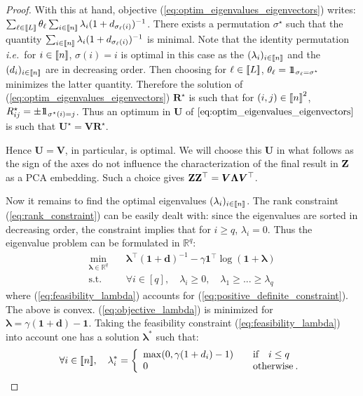 \begin{proof}
With this at hand, objective (\ref{eq:optim_eigenvalues_eigenvectors}) writes: $\sum_{\ell \in {[\![L]\!]}} \theta_\ell \sum_{i \in {[\![n]\!]}} \lambda_i (1 + d_{\sigma_\ell(i)})^{-1}$. There exists a permutation $\sigma^\star$ such that the quantity $\sum_{i \in {[\![n]\!]}} \lambda_i (1 + d_{\sigma_\ell(i)})^{-1}$ is minimal. Note that the identity permutation \textit{i.e.}\ for $i \in {[\![n]\!]}$, $ \sigma(i) = i$ is optimal in this case as the $(\lambda_i)_{i \in {[\![n]\!]}}$ and the $(d_i)_{i \in {[\![n]\!]}}$ are in decreasing order. Then choosing for $\ell \in {[\![L]\!]}$, $\theta_\ell = 1\!\!1_{\sigma_\ell = \sigma^\star}$ minimizes the latter quantity. Therefore the solution of (\ref{eq:optim_eigenvalues_eigenvectors}) $\bm{R}^{\star}$ is such that for $(i,j) \in {[\![n]\!]}^2$, $R^\star_{ij} = \pm 1\!\!1_{\sigma^\star(i)=j}$. Thus an optimum in $\bm{U}$ of $\ref{eq:optim_eigenvalues_eigenvectors}$ is such that $\bm{U}^\star = \bm{V} \bm{R}^\star$. 

Hence $\bm{U} = \bm{V}$, in particular, is optimal. We will choose this $\bm{U}$ in what follows as the sign of the axes do not influence the characterization of the final result in $\mathbf{Z}$ as a PCA embedding. Such a choice gives $\mathbf{Z} \mathbf{Z}^\top = \bm{V} \bm{\Lambda} \bm{V}^\top$. 

Now it remains to find the optimal eigenvalues $(\lambda_i)_{i \in {[\![n]\!]}}$. The rank constraint (\ref{eq:rank_constraint}) can be easily dealt with: since the eigenvalues are sorted in decreasing order, the constraint implies that for $i \geq q$, $\lambda_i=0$.  Thus the eigenvalue problem can be formulated in $\mathbb{R}^q$:
\begin{align}
    \min_{\bm{\lambda} \in \mathbb{R}^q} \quad & \bm{\lambda}^\top (\bm{1} + \bm{d})^{-1} - \gamma \bm{1}^\top \log (\bm{1} + \bm{\lambda}) \label{eq:objective_lambda}\\
    \textrm{s.t.} \quad & \forall i \in [q], \quad  \lambda_i \geq 0 , \quad \lambda_1 \geq ... \geq \lambda_q \label{eq:feasibility_lambda}
\end{align}
where (\ref{eq:feasibility_lambda}) accounts for (\ref{eq:positive_definite_constraint}). The above is convex. (\ref{eq:objective_lambda}) is minimized for $\bm{\lambda} = \gamma (\bm{1} + \bm{d}) - \bm{1}$. Taking the feasibility constraint (\ref{eq:feasibility_lambda}) into account one has a solution $\bm{\lambda}^*$ such that:
$$\forall i \in {[\![n]\!]}, \quad 
\lambda_i^* = \left\{
    \begin{array}{ll}
        \max(0, \gamma(1 + d_i) - 1) \quad &\mbox{if} \quad i \leq q \\
        0 \quad &\mbox{otherwise} \:.
    \end{array}
\right. $$


\end{proof}
